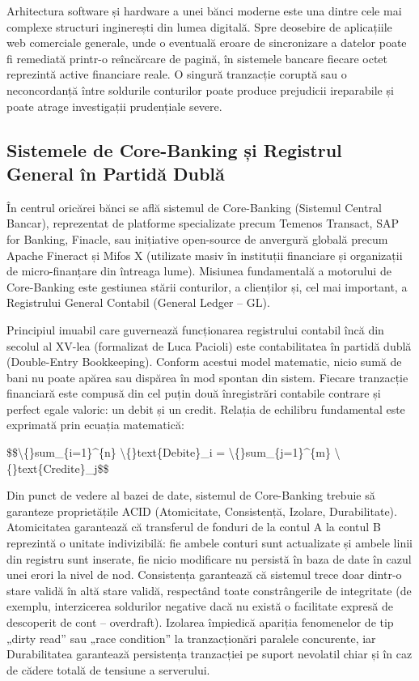 Arhitectura software și hardware a unei bănci moderne este una dintre cele mai complexe structuri inginerești din lumea digitală. Spre deosebire de aplicațiile web comerciale generale, unde o eventuală eroare de sincronizare a datelor poate fi remediată printr-o reîncărcare de pagină, în sistemele bancare fiecare octet reprezintă active financiare reale. O singură tranzacție coruptă sau o neconcordanță între soldurile conturilor poate produce prejudicii ireparabile și poate atrage investigații prudențiale severe.

\subsection{Sistemele de Core-Banking și Registrul General în Partidă Dublă}

În centrul oricărei bănci se află sistemul de Core-Banking (Sistemul Central Bancar), reprezentat de platforme specializate precum Temenos Transact, SAP for Banking, Finacle, sau inițiative open-source de anvergură globală precum Apache Fineract și Mifos X (utilizate masiv în instituții financiare și organizații de micro-finanțare din întreaga lume). Misiunea fundamentală a motorului de Core-Banking este gestiunea stării conturilor, a clienților și, cel mai important, a Registrului General Contabil (General Ledger – GL).

Principiul imuabil care guvernează funcționarea registrului contabil încă din secolul al XV-lea (formalizat de Luca Pacioli) este contabilitatea în partidă dublă (Double-Entry Bookkeeping). Conform acestui model matematic, nicio sumă de bani nu poate apărea sau dispărea în mod spontan din sistem. Fiecare tranzacție financiară este compusă din cel puțin două înregistrări contabile contrare și perfect egale valoric: un debit și un credit. Relația de echilibru fundamental este exprimată prin ecuația matematică:

\$\$\textbackslash\{\}sum\_\{i=1\}\textasciicircum{}\{n\} \textbackslash\{\}text\{Debite\}\_i = \textbackslash\{\}sum\_\{j=1\}\textasciicircum{}\{m\} \textbackslash\{\}text\{Credite\}\_j\$\$

Din punct de vedere al bazei de date, sistemul de Core-Banking trebuie să garanteze proprietățile ACID (Atomicitate, Consistență, Izolare, Durabilitate). Atomicitatea garantează că transferul de fonduri de la contul A la contul B reprezintă o unitate indivizibilă: fie ambele conturi sunt actualizate și ambele linii din registru sunt inserate, fie nicio modificare nu persistă în baza de date în cazul unei erori la nivel de nod. Consistența garantează că sistemul trece doar dintr-o stare validă în altă stare validă, respectând toate constrângerile de integritate (de exemplu, interzicerea soldurilor negative dacă nu există o facilitate expresă de descoperit de cont – overdraft). Izolarea împiedică apariția fenomenelor de tip „dirty read” sau „race condition” la tranzacționări paralele concurente, iar Durabilitatea garantează persistența tranzacției pe suport nevolatil chiar și în caz de cădere totală de tensiune a serverului.


